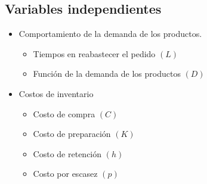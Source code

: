 \subsection{Variables independientes}
\begin{itemize}
	\item Comportamiento de la demanda de los productos.
	\begin{itemize}
		\item Tiempos en reabastecer el pedido $(L)$
		\item Función de la demanda de los productos $(D)$ 
	\end{itemize}
	\item Costos de inventario
	\begin{itemize}
		\item Costo de compra $(C)$
		\item Costo de preparación $(K)$
		\item Costo de retención $(h)$
		\item Costo por escasez $(p)$
	\end{itemize}
	
\end{itemize}

